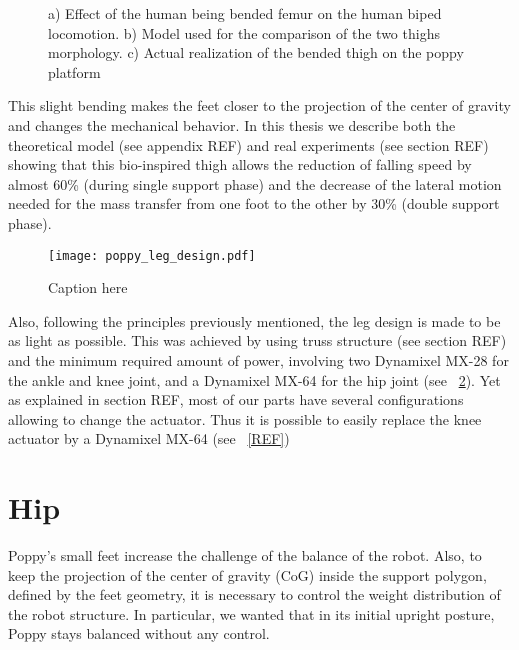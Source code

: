 \begin{figure}[tb]
\centering
    \hfil
    \caption{ a) Effect of the human being bended femur on the human biped locomotion. b) Model used for the comparison of the two thighs morphology. c) Actual realization of the bended thigh on the poppy platform}
    \label{fig:poppy_thigh}
\end{figure}


This slight bending makes the feet closer to the projection of the center of gravity and changes the mechanical behavior.
In this thesis we describe both the theoretical model (see appendix REF) and real experiments (see section REF) showing that this bio-inspired thigh allows the reduction of falling speed by almost 60\% (during single support phase) and the decrease of the lateral motion needed for the mass transfer from one foot to the other by 30\% (double support phase).


\begin{figure}[p]
    \begin{center}
        \texttt{[image: poppy\_leg\_design.pdf]}
    \end{center}
    \caption{Caption here}
    \label{fig:poppy_leg_design}
\end{figure}


Also, following the principles previously mentioned, the leg design is made to be as light as possible. This was achieved by using truss structure (see section REF) and the minimum required amount of power, involving two Dynamixel MX-28 for the ankle and knee joint, and a Dynamixel MX-64 for the hip joint (see \figurename~\ref{fig:poppy_leg_design}). Yet as explained in section REF, most of our parts have several configurations allowing to change the actuator. Thus it is possible to easily replace the knee actuator by a Dynamixel MX-64 (see \figurename~\ref{REF})



\section{Hip} %
\label{sec:hip}


Poppy's small feet increase the challenge of the balance of the robot. Also, to keep the projection of the center of gravity (CoG) inside the support polygon, defined by the feet geometry, it is necessary to control the weight distribution of the robot structure. In particular, we wanted that in its initial upright posture, Poppy stays balanced without any control.

